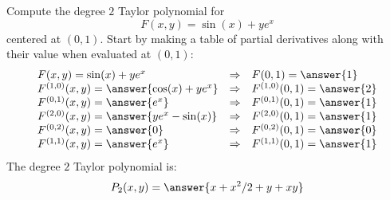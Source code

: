 \documentclass{ximera}
\author{Bart Snapp}
\begin{document}
\begin{exercise}
  Compute the degree $2$ Taylor polynomial for
  \[
  F(x,y) = \sin(x)+ye^x
  \]
  centered at $(0,1)$. Start by making a table of partial
  derivatives along with their value when evaluated at $(0,1)$:
  \[
  \begin{array}{lcl}
    F(x,y) = \sin(x)+ ye^x & \Rightarrow &F(0,1) = \answer{1}\\
    F^{(1,0)}(x,y) = \answer{\cos(x)+ye^x} & \Rightarrow & F^{(1,0)}(0,1) = \answer{2}\\
    F^{(0,1)}(x,y) = \answer{e^x} &\Rightarrow  & F^{(0,1)}(0,1) = \answer{1}\\
    F^{(2,0)}(x,y) = \answer{ye^x-\sin(x)} &\Rightarrow & F^{(2,0)}(0,1) = \answer{1}\\
    F^{(0,2)}(x,y) = \answer{0} &\Rightarrow & F^{(0,2)}(0,1) = \answer{0}\\
    F^{(1,1)}(x,y) = \answer{e^x} &\Rightarrow & F^{(1,1)}(0,1) = \answer{1}
    \end{array}
    \]
    The degree $2$ Taylor polynomial is:
    \[
    P_2(x,y) =\answer{x+x^2/2+y+xy}
    \]
\end{exercise}
\end{document}
